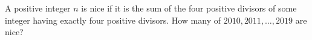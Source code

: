 A positive integer $ n $ is nice if it is the sum of the four positive divisors of some integer having exactly four positive divisors. How many of $ 2010,2011,\ldots,2019 $ are nice?
